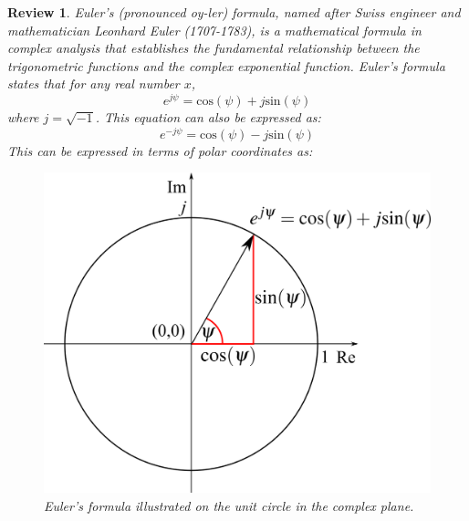 \documentclass[12pt,letter]{article}
\numberwithin{ex}{section} %
\newtheorem{re}{Review}
\numberwithin{re}{section} %
\newenvironment{review}{\begin{mdframed}[middlelinewidth=2mm,roundcorner=20pt]\begin{re}\normalfont}{\end{re}\end{mdframed}}
\numberwithin{equation}{section}	%
\begin{document}
		\begin{review}
		
			Euler's (pronounced oy-ler) formula, named after Swiss engineer and mathematician Leonhard Euler (1707-1783), is a mathematical formula in complex analysis that establishes the fundamental relationship between the trigonometric functions and the complex exponential function. Euler's formula states that for any real number $x$,
			\begin{equation}
				e^{j\psi} = \text{cos}(\psi) + j \text{sin}(\psi)
			\end{equation}		
			where $j=\sqrt{-1}$. This equation can also be expressed as:
			\begin{equation}
				e^{-j\psi} = \text{cos}(\psi) - j \text{sin}(\psi)
			\end{equation}	
			This can be expressed in terms of polar coordinates as:				
			\begin{figure}[H]
				\centering
				\includegraphics[]{../figures/Eulers_formula.png}
				\caption{Euler's formula illustrated on the unit circle in the complex plane.}
			\end{figure}
		\end{review}
\end{document}
